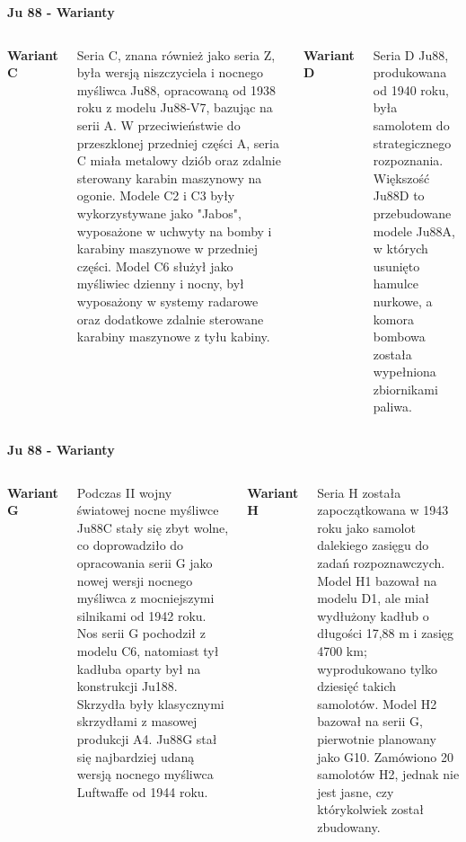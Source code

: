 \begin{frame}[t]{\Huge{\textbf{Ju 88 - Warianty}}}
	\begin{columns}[t]

{\large{\textbf{Wariant C}}}	\\~\
	\justifying

Seria C, znana również jako seria Z, była wersją niszczyciela i nocnego myśliwca Ju88, opracowaną od 1938 roku z modelu Ju88-V7, bazując na serii A. W przeciwieństwie do przeszklonej przedniej części A, seria C miała metalowy dziób oraz zdalnie sterowany karabin maszynowy na ogonie. Modele C2 i C3 były wykorzystywane jako "Jabos", wyposażone w uchwyty na bomby i karabiny maszynowe w przedniej części. Model C6 służył jako myśliwiec dzienny i nocny, był wyposażony w systemy radarowe oraz dodatkowe zdalnie sterowane karabiny maszynowe z tyłu kabiny.

		
{\large{\textbf{Wariant D}}}	\\~\
	\justifying

Seria D Ju88, produkowana od 1940 roku, była samolotem do strategicznego rozpoznania. Większość Ju88D to przebudowane modele Ju88A, w których usunięto hamulce nurkowe, a komora bombowa została wypełniona zbiornikami paliwa.

	\end{columns}
\end{frame}


\begin{frame}[t]{\Huge{\textbf{Ju 88 - Warianty}}}
	\begin{columns}[t]
		\column{0.5\textwidth} 

{\large{\textbf{Wariant G}}}	\\~\
	\justifying

Podczas II wojny światowej nocne myśliwce Ju88C stały się zbyt wolne, co doprowadziło do opracowania serii G jako nowej wersji nocnego myśliwca z mocniejszymi silnikami od 1942 roku. Nos serii G pochodził z modelu C6, natomiast tył kadłuba oparty był na konstrukcji Ju188. Skrzydła były klasycznymi skrzydłami z masowej produkcji A4. Ju88G stał się najbardziej udaną wersją nocnego myśliwca Luftwaffe od 1944 roku.

		
{\large{\textbf{Wariant H}}}	\\~\
	\justifying

Seria H została zapoczątkowana w 1943 roku jako samolot dalekiego zasięgu do zadań rozpoznawczych. Model H1 bazował na modelu D1, ale miał wydłużony kadłub o długości 17,88 m i zasięg 4700 km; wyprodukowano tylko dziesięć takich samolotów. Model H2 bazował na serii G, pierwotnie planowany jako G10. Zamówiono 20 samolotów H2, jednak nie jest jasne, czy którykolwiek został zbudowany.

	\end{columns}
\end{frame}

